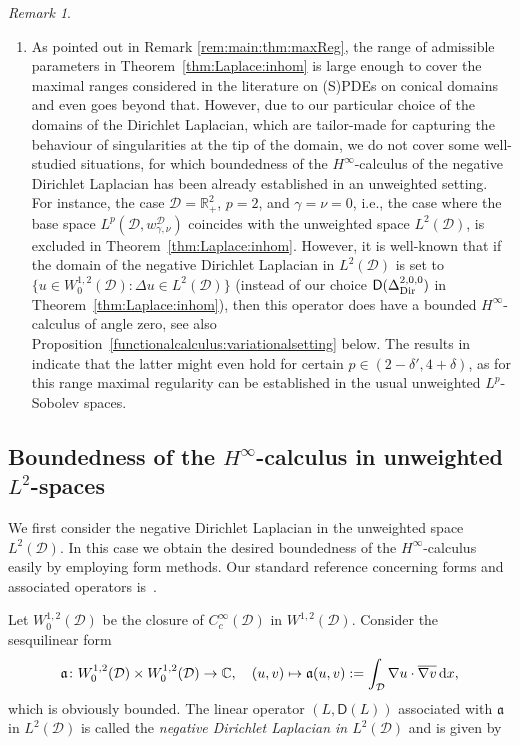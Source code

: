 \documentclass[12pt,a4paper, reqno]{amsart}
\theoremstyle{plain}
\theoremstyle{definition}
\theoremstyle{remark}
\newtheorem{remark}[theorem]{Remark}
\numberwithin{equation}{section}
\newcommand{\1}{\mathbbm{1}}
\newcommand{\dd}{\textup{d}}
\newcommand{\R}{\ensuremath{\mathbb{R}}}
\newcommand{\C}{\ensuremath{\mathbb{C}}}
\newcommand{\calD}{\ensuremath{\mathcal{D}}}
\newcommand{\sfD}{\ensuremath{\mathsf{D}}}
\newcommand{\fraka}{\ensuremath{\mathfrak{a}}}
\newcommand{\Dir}{\textup{Dir}}
\begin{document}
\begin{remark}
\begin{enumerate}[\textup{(\roman*)}]
\item\label{it:rem:main:sharp} 
As pointed out in Remark \ref{rem:main:thm:maxReg}, the range of admissible parameters in Theorem~\ref{thm:Laplace:inhom} is large enough to cover the maximal ranges considered in the literature on (S)PDEs on conical domains and even goes beyond that. However, due to our particular choice of the domains of the Dirichlet Laplacian, which are tailor-made for capturing the behaviour of singularities at the tip of the domain, we do not cover some well-studied situations, for which boundedness of the $H^\infty$-calculus of the negative Dirichlet Laplacian has been already established in an unweighted setting. 
For instance, the case $\calD=\R_+^2$, $p=2$, and $\gamma=\nu=0$, i.e., the case where the base space $L^p(\calD,w_{\gamma,\nu}^\calD)$ coincides with the unweighted space $L^2(\calD)$, is excluded in Theorem~\ref{thm:Laplace:inhom}.
However, it is well-known that if the domain of the negative Dirichlet Laplacian in $L^2(\calD)$ is set to 
$\{ u\in W_0^{1,2}(\calD)\colon \Delta u\in L^2(\calD) \}$ (instead of our choice $\sfD(\Delta_\Dir^{2,0,0})$ in Theorem~\ref{thm:Laplace:inhom}), then this operator does have a bounded $H^\infty$-calculus of angle zero, see also Proposition~\ref{functionalcalculus:variationalsetting} below.
The results in~\cite{Wood_2007} indicate that the latter might even hold for certain $p\in (2-\delta',4+\delta)$, as for this range maximal regularity can be established in the usual unweighted $L^p$-Sobolev spaces.
\end{enumerate}
\end{remark}





\subsection{Boundedness of the \texorpdfstring{$H^\infty$}{H}-calculus in unweighted \texorpdfstring{$L^2$}{L}-spaces}\label{sec:FunCalc:L2}
    We first consider the negative Dirichlet Laplacian in the unweighted space $L^2(\calD)$. In this case we obtain the desired boundedness of the $H^\infty$-calculus easily by employing form methods.
    Our standard reference concerning forms and associated operators is~\cite{isem27_HarmonicAnalysis}. 

    Let $W_0^{1,2}(\calD)$ be the closure of $C_c^\infty(\calD)$ in $W^{1,2}(\calD)$.
    Consider the sesquilinear form     
    \[\fraka\colon W_0^{1,2}(\calD)\times W_0^{1,2}(\calD)\to\C,\quad (u,v)\mapsto \fraka(u,v):= \int_\calD \nabla u \cdot \overline{\nabla v}\,\dd x, \]
    which is obviously bounded. The linear operator $(L,\sfD(L))$ associated with $\fraka$ in $L^2(\calD)$ is called the \emph{negative Dirichlet Laplacian in $L^2(\calD)$} and is given by
\end{document}
